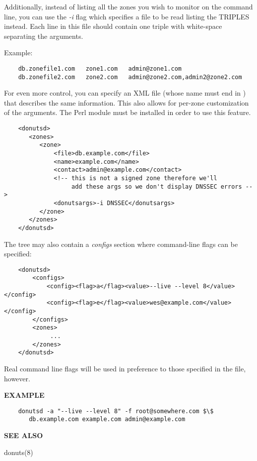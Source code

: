 Additionally, instead of listing all the zones you wish to monitor on
the command line, you can use the {\it -i} flag which specifies a
file to be read listing the TRIPLES instead.  Each line in this file
should contain one triple with white-space separating the arguments.

Example:

\begin{verbatim}
    db.zonefile1.com   zone1.com   admin@zone1.com
    db.zonefile2.com   zone2.com   admin@zone2.com,admin2@zone2.com
\end{verbatim}

For even more control, you can specify an XML file (whose name must end in
) that describes the same information.  This also allows for
per-zone customization of the  arguments.  The 
Perl module must be installed in order to use this feature.

\begin{verbatim}
    <donutsd>
       <zones>
          <zone>
              <file>db.example.com</file>
              <name>example.com</name>
              <contact>admin@example.com</contact>
              <!-- this is not a signed zone therefore we'll
                   add these args so we don't display DNSSEC errors -->
              <donutsargs>-i DNSSEC</donutsargs>
          </zone>
       </zones>
    </donutsd>
\end{verbatim}

The  tree may also contain a {\it configs} section where
command-line flags can be specified:

\begin{verbatim}
    <donutsd>
        <configs>
            <config><flag>a</flag><value>--live --level 8</value></config>
            <config><flag>e</flag><value>wes@example.com</value></config>
        </configs>
        <zones>
             ...
        </zones>
    </donutsd>
\end{verbatim}

Real command line flags will be used in preference to those specified
in the  file, however.

{\bf EXAMPLE}

\begin{verbatim}
    donutsd -a "--live --level 8" -f root@somewhere.com $\$
       db.example.com example.com admin@example.com
\end{verbatim}

{\bf SEE ALSO}

donuts(8)

